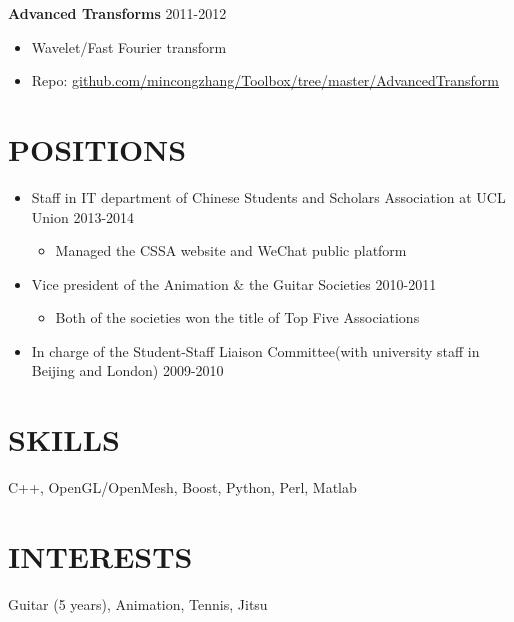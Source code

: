 \documentclass[line,margin]{res}
\begin{document}
\begin{resume}
{\bf Advanced Transforms}
\hfill{\textcolor[rgb]{0.7,0.7,0.7}{2011-2012}}
\begin{itemize}\itemsep -2pt %
    \item Wavelet/Fast Fourier transform
    \item Repo: \href{https://github.com/mincongzhang/Toolbox/tree/master/AdvancedTransform}{github.com/mincongzhang/Toolbox/tree/master/AdvancedTransform}
\end{itemize}

\section{POSITIONS}
\begin{itemize}\itemsep -2pt %

    \item Staff in IT department of Chinese Students and Scholars Association at UCL Union \hfill{\textcolor[rgb]{0.7,0.7,0.7}{2013-2014}}\vspace{-6pt}
    \begin{itemize}\itemsep -2pt %
    \item Managed the CSSA website and WeChat public platform
    \end{itemize}
    
    \item Vice president of the Animation \& the Guitar Societies \hfill{\textcolor[rgb]{0.7,0.7,0.7}{2010-2011}}\vspace{-6pt}
    \begin{itemize}\itemsep -2pt %
    \item Both of the societies won the title of Top Five Associations
    \end{itemize}
    \item In charge of the Student-Staff Liaison Committee(with university staff in Beijing and London)
    \hfill{\textcolor[rgb]{0.7,0.7,0.7}{2009-2010}}
\end{itemize}


\section{SKILLS}
C++, OpenGL/OpenMesh, Boost, Python, Perl, Matlab 

\section{INTERESTS}
Guitar (5 years), Animation, Tennis, Jitsu
\end{resume}
\end{document}
